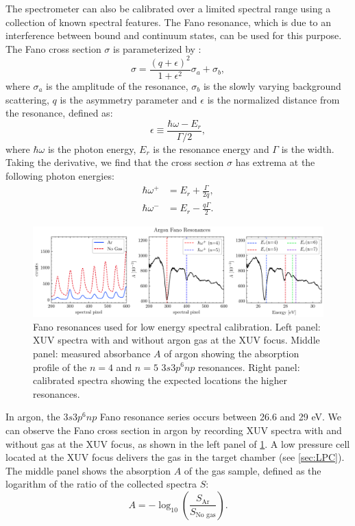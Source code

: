 The spectrometer can also be calibrated over a limited spectral range using a collection of known spectral features. The Fano resonance, which is due to an interference between bound and continuum states, can be used for this purpose. The Fano cross section $\sigma$ is parameterized by \cite{sorensenArgon3sAutoionization1994,caretteMulticonfigurationalHartreeFockClosecoupling2013}:
\begin{equation}
\sigma = \frac{(q+\epsilon)^2}{1+\epsilon^2} \sigma_a + \sigma_b,
\label{eqn:Fano_sigma}
\end{equation}
where $\sigma_a$ is the amplitude of the resonance, $\sigma_b$ is the slowly varying background scattering, $q$ is the asymmetry parameter and $\epsilon$ is the normalized distance from the resonance, defined as:
\begin{equation}
\epsilon \equiv \frac{\hbar \omega - E_r}{\Gamma/2},
\end{equation}
where $\hbar \omega$ is the photon energy, $E_r$ is the resonance energy and $\Gamma$ is the width. Taking the derivative, we find that the cross section $\sigma$ has extrema at the following photon energies:
\begin{align}
\hbar \omega^+ &= E_r + \frac{\Gamma}{2 q}, \\
\hbar \omega^- &= E_r - \frac{q \Gamma}{2}.
\end{align}

\begin{figure}
	\centering
	\includegraphics[width=1.0\textwidth]{figures/chap2/ar-fano-calibration.pdf}
	\caption{Fano resonances used for low energy spectral calibration. Left panel: XUV spectra with and without argon gas at the XUV focus. Middle panel: measured absorbance $A$ of argon showing the absorption profile of the $n=4$ and $n=5$ $3s3p^6np$ resonances. Right panel: calibrated spectra showing the expected locations the higher resonances.}
	\label{fig:fano-calibration}
\end{figure}

In argon, the $3s3p^6np$ Fano resonance series occurs between 26.6 and 29 eV. We can observe the Fano cross section in argon by recording XUV spectra with and without gas at the XUV focus, as shown in the left panel of \cref{fig:fano-calibration}. A low pressure cell located at the XUV focus delivers the gas in the target chamber (see \cref{sec:LPC}). The middle panel shows the absorption $A$ of the gas sample, defined as the logarithm of the ratio of the collected spectra $S$:
\begin{equation}
A = - \log_{10} \left( \frac{S_{\textrm{Ar}}}{S_{\textrm{No gas}}} \right).
\end{equation}

